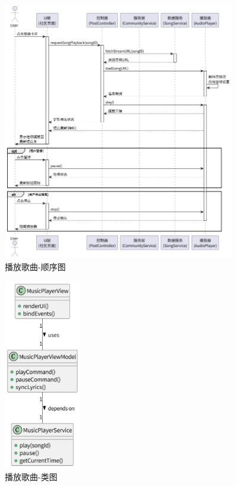 \documentclass{base}
\numberwithin{figure}{section} %
\begin{document}
\begin{figure}[H]
    \centering
    \includegraphics[width=0.9\textwidth]{images/5-1.png}
    \caption{播放歌曲-顺序图}
\end{figure}
\begin{figure}[H]
    \centering
    \includegraphics[width=0.3\textwidth]{images/5-2.png}
    \caption{播放歌曲-类图}
\end{figure}
\end{document}
